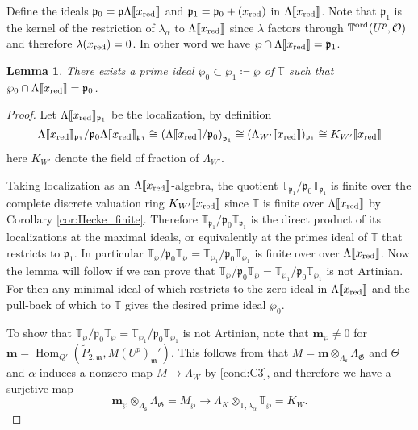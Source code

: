 \documentclass[leqno]{amsart}
\newtheorem{lem}[thm]{Lemma}
\theoremstyle{definition}
\theoremstyle{remark}
\newcommand{\oo}{\mathcal{O}}
\DeclareMathOperator{\Hom}{Hom}
\newcommand{\fm}{\mathfrak{m}}
\newcommand{\fp}{\mathfrak{p}}
\newcommand{\fs}{\mathfrak{s}}
\newcommand{\xx}{x_\textnormal{red}}
\newcommand{\fG}{\mathfrak{G}}
\newcommand{\TT}{\mathbb{T}} %
\newcommand{\ord}{\textnormal{ord}} %
\begin{document}
Define the ideals
$\fp_0=\fp\Lambda\llbracket \xx\rrbracket$
and $\fp_1=\fp_0+(\xx)$ in 
$\Lambda\llbracket \xx\rrbracket$.
Note that 
$\fp_1$ is the kernel of the restriction 
of $\lambda_\alpha$ to 
$\Lambda\llbracket \xx\rrbracket$
since $\lambda$ factors through $\TT^{\ord}(U^p,\oo)$
and therefore $\lambda(\xx)=0$.
In other word we have
$\wp\cap \Lambda\llbracket \xx\rrbracket=\fp_1$.

\begin{lem}
There exists a prime ideal 
$\wp_0\subset \wp_1\coloneqq\wp$
of $\TT$ such that 
$\wp_0\cap \Lambda\llbracket \xx\rrbracket=\fp_0$.
\end{lem}
\begin{proof}
Let $\Lambda\llbracket\xx\rrbracket_{\fp_1}$
be the localization,
by definition
\[
\Lambda\llbracket\xx\rrbracket_{\fp_1}/
\fp_0\Lambda\llbracket\xx\rrbracket_{\fp_1}\cong
\left(
\Lambda\llbracket\xx\rrbracket/\fp_0
\right)_{\fp_1}\cong
(\Lambda_{W'}\llbracket\xx\rrbracket)_{\fp_1}\cong 
K_{W'}\llbracket\xx\rrbracket
\]
here $K_{W'}$ denote the field of fraction
of $\Lambda_{W'}$.

Taking localization 
as an $\Lambda\llbracket\xx\rrbracket$-algebra,
the quotient
$\TT_{\fp_1}/\fp_0\TT_{\fp_1}$
is finite over
the complete discrete valuation ring
$K_{W'}\llbracket\xx\rrbracket$
since $\TT$ is finite
over $\Lambda\llbracket\xx\rrbracket$
by Corollary \ref{cor:Hecke_finite}.
Therefore
$\TT_{\fp_1}/\fp_0\TT_{\fp_1}$
is the direct product
of its localizations at the maximal ideals,
or equivalently 
at the primes ideal of $\TT$
that restricts to $\fp_1$.
In particular 
$\TT_{\wp}/\fp_0\TT_{\wp}=\TT_{\wp_1}/\fp_0\TT_{\wp_1}$
is finite over 
over $\Lambda\llbracket\xx\rrbracket$.
Now the lemma will follow
if we can prove that
$\TT_{\wp}/\fp_0\TT_{\wp}=\TT_{\wp_1}/\fp_0\TT_{\wp_1}$
is not Artinian.
For then any minimal ideal of which
restricts to the zero ideal in
$\Lambda\llbracket\xx\rrbracket$
and the pull-back of which to $\TT$
gives the desired prime ideal $\wp_0$.

To show that
$\TT_{\wp}/\fp_0\TT_{\wp}=\TT_{\wp_1}/\fp_0\TT_{\wp_1}$
is not Artinian,
note that 
$\mathbf{m}_\wp\neq 0$
for $\mathbf{m}=\Hom_{Q'}(\tilde{P}_{2,\fm},M(U^p)_\fm')$.
This follows from 
that $M=\mathbf{m}\otimes_{\Lambda_\fs}\Lambda_\fG$
and $\Theta$ and $\alpha$ induces a nonzero map
$M\to \Lambda_W$
by \ref{cond:C3}, and
therefore we have a surjetive map
\[
\mathbf{m}_\wp\otimes_{\Lambda_\fs}\Lambda_\fG=
M_\wp\to \Lambda_K\otimes_{\TT,\lambda_\alpha}\TT_\wp=K_W.
\]


\end{proof}
\end{document}
